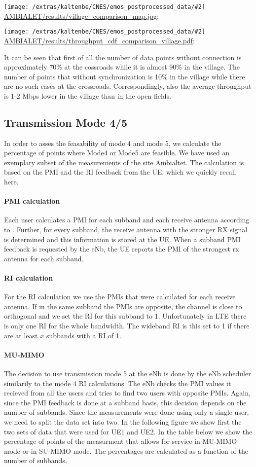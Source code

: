 \documentclass[a4paper,10pt]{article}
\newcommand{\printfile}[2][]{
 \begin{minipage}{8cm}
  \centering
  \texttt{[image: /extras/kaltenbe/CNES/emos\_postprocessed\_data/\#2]}
  \url{#2}: #1

 \end{minipage}
}
\begin{document}
\printfile{AMBIALET/results/village_comparison_map.jpg}
\printfile{AMBIALET/results/throughput_cdf_comparison_village.pdf}

It can be seen that first of all the number of data points without connection is approximately 70\% at the cossroads while it is almost 90\% in the village. The number of points that without synchronization is 10\% in the village while there are no such cases at the crossroads. Correspondingly, also the average throughput is 1-2 Mbps lower in the village than in the open fields. 

\subsection{Transmission Mode 4/5}
In order to asses the feasability of mode 4 and mode 5, we calculate the percentage of points where Mode4 or Mode5 are feasible. We have used an exemplary subset of the measurements of the site Ambialtet. The calculation is based on the PMI and the RI feedback from the UE, which we quickly recall here.

\paragraph{PMI calculation}
Each user calculates a PMI for each subband and each receive antenna according to \cite{ghaffar10b}. Further, for every subband, the receive antenna with the stronger RX signal is determined and this information is stored at the UE. When a subband PMI feedback is requested by the eNb, the UE reports the PMI of the strongest rx antenna for each subband. 

\paragraph{RI calculation}
For the RI calculation we use the PMIs that were calculated for each receive antenna. If in the same subband the PMIs are opposite, the channel is close to orthogonal and we set the RI for this subband to 1. Unfortunately in LTE there is only one RI for the whole bandwidth. The wideband RI is this set to 1 if there are at least $x$ subbands with a RI of 1. 

\paragraph{MU-MIMO}
The decision to use transmission mode 5 at the eNb is done by the eNb scheduler similarily to the mode 4 RI calculations. The eNb checks the PMI values it recieved from all the users and tries to find two users with opposite PMIs. Again, since the PMI feedback is done at a subband basis, this decision depends on the number of subbands. Since the measurements were done using only a single user, we need to split the data set into two. 
In the following figure we show first the two sets of data that were used for UE1 and UE2. In the table below we show the percentage of points of the measurment that allows for service in MU-MIMO mode or in SU-MIMO mode. The percentages are calculated as a function of the number of subbands.
\end{document}
